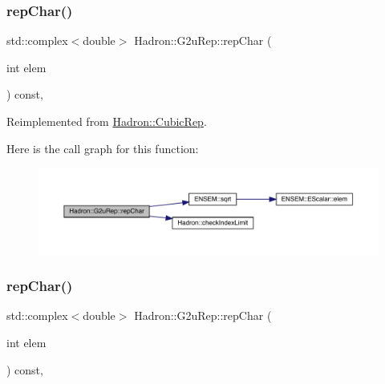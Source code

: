 \subsubsection{\texorpdfstring{repChar()}{repChar()}\hspace{0.1cm}{\footnotesize\ttfamily [2/3]}}
{\footnotesize\ttfamily std\+::complex$<$double$>$ Hadron\+::\+G2u\+Rep\+::rep\+Char (\begin{DoxyParamCaption}\item[{int}]{elem }\end{DoxyParamCaption}) const\hspace{0.3cm}{\ttfamily [inline]}, {\ttfamily [virtual]}}



Reimplemented from \mbox{\hyperlink{structHadron_1_1CubicRep_af45227106e8e715e84b0af69cd3b36f8}{Hadron\+::\+Cubic\+Rep}}.

Here is the call graph for this function\+:
\nopagebreak
\begin{figure}[H]
\begin{center}
\leavevmode
\includegraphics[width=350pt]{dc/dc0/structHadron_1_1G2uRep_a51ea6b7795e07c824b72dbefb7fb6ddb_cgraph}
\end{center}
\end{figure}
\mbox{\label{structHadron_1_1G2uRep_a51ea6b7795e07c824b72dbefb7fb6ddb}} 
\subsubsection{\texorpdfstring{repChar()}{repChar()}\hspace{0.1cm}{\footnotesize\ttfamily [3/3]}}
{\footnotesize\ttfamily std\+::complex$<$double$>$ Hadron\+::\+G2u\+Rep\+::rep\+Char (\begin{DoxyParamCaption}\item[{int}]{elem }\end{DoxyParamCaption}) const\hspace{0.3cm}{\ttfamily [inline]}, {\ttfamily [virtual]}}




